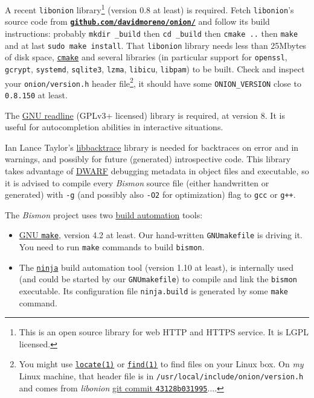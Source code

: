 A recent \texttt{libonion} library\footnote{This is an open source
  library for web HTTP and HTTPS service. It is LGPL licensed.}
(version 0.8 at least) is required. Fetch \texttt{libonion}'s source
code from
\href{https://github.com/davidmoreno/onion}{\texttt{\textbf{github.com/davidmoreno/onion/}}}
and follow its build instructions: probably \texttt{mkdir \_build} then
\texttt{cd \_build} then \texttt{cmake ..} then \texttt{make} and at
last \texttt{sudo make install}. That \texttt{libonion} library needs
less than 25Mbytes of disk space,
\href{https://cmake.org}{\texttt{cmake}} and several libraries (in
particular support for \texttt{openssl}, \texttt{gcrypt},
\texttt{systemd}, \texttt{sqlite3}, \texttt{lzma}, \texttt{libicu},
\texttt{libpam}) to be built. Check and inspect your
\texttt{onion/version.h} header file\footnote{You might use
  \href{https://man7.org/linux/man-pages/man1/locate.1.html}{\texttt{locate(1)}}
  or
  \href{https://man7.org/linux/man-pages/man1/find.1.html}{\texttt{find(1)}}
  to find files on your Linux box. On \emph{my} Linux machine, that
  header file is in \texttt{/usr/local/include/onion/version.h} and
  comes from \emph{libonion}
  \href{https://github.com/davidmoreno/onion/commit/43128b03199518d4878074c311ff71ff0018aea8}{git
    commit \texttt{43128b031995}}....}, it should have some
\texttt{ONION\_VERSION} close to \texttt{0.8.150} at least.

The \href{https://www.gnu.org/software/readline/}{GNU readline}
(GPLv3+ licensed) library is required, at version 8. It is useful for
autocompletion abilities in interactive situations.

Ian Lance Taylor's
\href{https://github.com/ianlancetaylor/libbacktrace}{libbacktrace}
library is needed for backtraces on error and in warnings, and
possibly for future (generated) introspective code. This library takes
advantage of \href{https://en.wikipedia.org/wiki/DWARF}{DWARF}
debugging metadata in object files and executable, so it is advised to
compile every \emph{Bismon} source file (either handwritten or
generated) with \texttt{-g} (and possibly also \texttt{-O2} for
optimization) flag to \texttt{gcc} or \texttt{g++}.


The \emph{Bismon} project  uses two \href{https://en.wikipedia.org/wiki/Build_automation}{build automation} tools:

\begin{itemize}

\item \href{https://www.gnu.org/software/make/}{GNU \texttt{make}},
  version 4.2 at least. Our hand-written \texttt{GNUmakefile} is
  driving it. You need to run \texttt{make} commands to build
  \texttt{bismon}.

\item
  The \href{https://ninja-build.org/}{\texttt{ninja}} build automation
  tool (version 1.10 at least), is internally used (and could be
  started by our \texttt{GNUmakefile}) to compile and link the
  \texttt{bismon} executable. Its configuration file
  \texttt{ninja.build} is generated by some \texttt{make} command.

\end{itemize}
  
